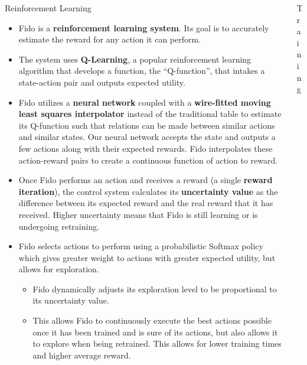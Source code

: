 \documentclass[final]{beamer}
\newlength{\onecolwid}
\newlength{\twocolwid}
\begin{document}
\begin{frame}[t]
\begin{columns}[t]
\begin{column}{\twocolwid}
\begin{columns}[t,totalwidth=\twocolwid]

	\begin{column}{\onecolwid}
		\begin{block}{Reinforcement Learning}
			\begin{itemize}
				\item Fido is a \textbf{reinforcement learning system}. Its goal is to accurately estimate the reward for any action it can perform.
				\item The system uses \textbf{Q-Learning}, a popular reinforcement learning algorithm that develops a function, the ``Q-function'', that intakes a state-action pair and outputs expected utility.
				\item Fido utilizes a \textbf{neural network} coupled with a \textbf{wire-fitted moving least squares interpolator} instead of the traditional table to estimate its Q-function such that relations can be made between similar actions and similar states. Our neural network accepts the state and outputs a few actions along with their expected rewards. Fido interpolates these action-reward pairs to create a continuous function of action to reward.
				\item Once Fido performs an action and receives a reward (a single \textbf{reward iteration}), the control system calculates its \textbf{uncertainty value} as the difference between its expected reward and the real reward that it has received. Higher uncertainty means that Fido is still learning or is undergoing retraining.
				\item Fido selects actions to perform using a probabilistic Softmax policy which gives greater weight to actions with greater expected utility, but allows for exploration.
				\begin{itemize}
					\item Fido dynamically adjusts its exploration level to be proportional to its uncertainty value.
					\item This allows Fido to continuously execute the best actions possible once it has been trained and is sure of its actions, but also allows it to explore when being retrained.  This allows for lower training times and higher average reward.
				\end{itemize}
			\end{itemize}
		\end{block}
	\end{column}

	\begin{column}{\onecolwid}\begin{block}{Training}


\end{block}
\end{column}
\end{columns}
\end{column}
\end{columns}
\end{frame}
\end{document}
